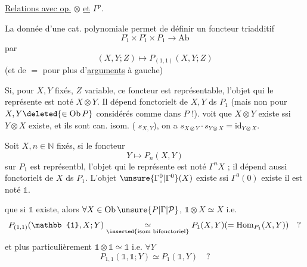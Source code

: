 \uline{Relations avec op.} $\otimes$ \uline{et} $\Gamma^p$.

La donnée d'une cat. polynomiale  permet
de définir un foncteur triadditif
\[
P_1^\circ\times P_1^\circ\times P_1\longrightarrow\mathrm{Ab}
\]
par
\[
(X,Y;Z)\longmapsto P_{(1,1)}(X,Y;Z)
\]
(et de $=$ pour plus d'\uline{arguments} à gauche)

Si, pour $X,Y$ fixés, $Z$ variable, ce foncteur
est représentable, l'objet qui le représente est
noté $X\otimes Y$. Il dépend fonctorielt de
$X,Y$ ds $P_1$ (mais non pour $X,Y\deleted{\in\operatorname{Ob}P}$ considérés
comme dans $P$ !).  voit que $X\otimes Y$ existe
ssi $Y\otimes X$ existe, et ils sont can. isom. (
$s_{X,Y}$), on a $s_{X\otimes Y}\cdot s_{Y\otimes X}=\mathrm{id}_{Y\otimes X}$.

Soit $X,n\in\mathbb N$ fixés, si le foncteur
\[
Y\longmapsto P_n(X,Y)
\]
sur $P_1$ est représentbl, l'objet qui le représente
est noté $\Gamma^n X$ ; il  dépend aussi fonctorielt
de $X$ ds $P_1$. L'objet $\unsure{\Gamma_{\scriptscriptstyle\circ}^0|\Gamma^0}(X)$ existe ssi $\Gamma^0(0)$ existe
il est noté $\mathbb{1}$.

 que \deleted{\unsure{$\forall$}} si $\mathbb{1}$ existe, alors $\forall X\in\operatorname{Ob}\unsure{P|\Gamma|\mathcal P}$,
$\mathbb{1}\otimes X\simeq X$ i.e.
\[
P_{(1,1)}(\mathbb{1},X;Y)\underset{\inserted{\text{isom bifonctoriel}}}{\simeq}P_1(X,Y)(=\operatorname{Hom}_{P_1}(X,Y))\quad ?
\]
et plus particulièrement $\mathbb{1}\otimes\mathbb{1}\simeq\mathbb{1}$ i.e. $\forall Y$
\[
P_{1,1}(\mathbb{1},\mathbb{1};Y)\simeq P_1(\mathbb{1},Y)\quad ?
\]
